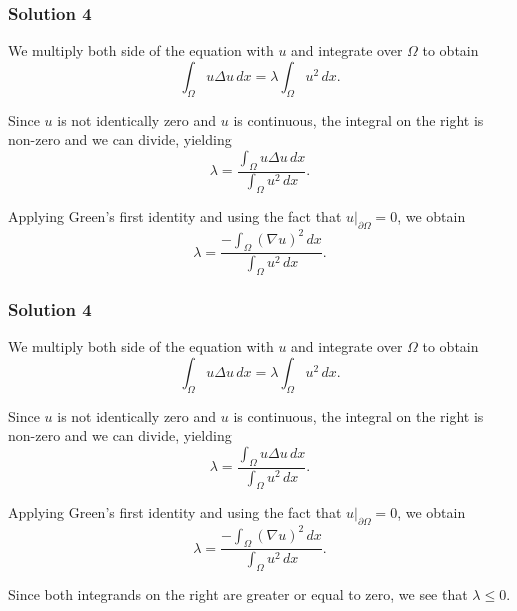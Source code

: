\documentclass[10pt, t, allowdisplaybreaks]{beamer}
\newcommand{\at}[3]{\left.#1\right\vert_{#2}^{#3}}
\begin{document}
\begin{frame}
    \frametitle{Solution 4}
    \par We multiply both side of the equation with $u$ and integrate over $\Omega$ to obtain 
    \begin{equation*}
        \int_\Omega u\Delta u\,dx = \lambda\int_\Omega u^2\,dx.
    \end{equation*}
        
    \par Since $u$ is not identically zero and $u$ is continuous, the integral on the right is non-zero and we can divide, yielding
    \begin{equation*}
        \lambda = \frac{\int_\Omega u\Delta u\,dx}{\int_\Omega u^2\,dx}.
    \end{equation*}

    \par Applying Green's first identity and using the fact that $\at{u}{\partial \Omega}{} = 0$, we obtain
    \begin{equation*}
        \lambda = \frac{-\int_\Omega (\nabla u)^2\,dx}{\int_\Omega u^2\,dx}.
    \end{equation*}
\end{frame}
\begin{frame}
    \frametitle{Solution 4}
    \par We multiply both side of the equation with $u$ and integrate over $\Omega$ to obtain 
    \begin{equation*}
        \int_\Omega u\Delta u\,dx = \lambda\int_\Omega u^2\,dx.
    \end{equation*}
        
    \par Since $u$ is not identically zero and $u$ is continuous, the integral on the right is non-zero and we can divide, yielding
    \begin{equation*}
        \lambda = \frac{\int_\Omega u\Delta u\,dx}{\int_\Omega u^2\,dx}.
    \end{equation*}

    \par Applying Green's first identity and using the fact that $\at{u}{\partial \Omega}{} = 0$, we obtain
    \begin{equation*}
        \lambda = \frac{-\int_\Omega (\nabla u)^2\,dx}{\int_\Omega u^2\,dx}.
    \end{equation*}

    \par Since both integrands on the right are greater or equal to zero, we see that $\lambda\leq 0$.
\end{frame}
\end{document}
